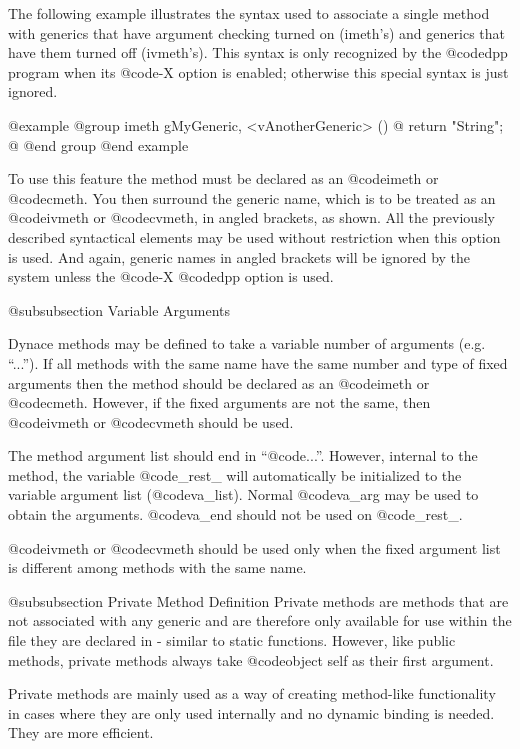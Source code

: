 The following example illustrates the syntax used to associate a single
method with generics that have argument checking turned on (imeth's)
and generics that have them turned off (ivmeth's).  This syntax is
only recognized by the @code{dpp} program when its @code{-X} option is enabled;
otherwise this special syntax is just ignored.


@example
@group
imeth   gMyGeneric, <vAnotherGeneric> ()
@{
        return "String";
@}
@end group
@end example


To use this feature the method must be declared as an @code{imeth} or
@code{cmeth}.  You then surround the generic name, which is to be
treated as an @code{ivmeth} or @code{cvmeth}, in angled brackets, as
shown.  All the previously described syntactical elements may be
used without restriction when this option is used.  And again,
generic names in angled brackets will be ignored by the system unless
the @code{-X} @code{dpp} option is used.




@subsubsection Variable Arguments

Dynace methods may be defined to take a variable number of arguments
(e.g. ``...'').  If all methods with the same name have the same number
and type of fixed arguments then the method should be declared as an
@code{imeth} or @code{cmeth}.  However, if the fixed arguments are not
the same, then @code{ivmeth} or @code{cvmeth} should be used.

The method argument list should end in ``@code{...}''.  However, internal
to the method, the variable @code{_rest_} will automatically be
initialized to the variable argument list (@code{va_list}).  Normal
@code{va_arg} may be used to obtain the arguments.  @code{va_end}
should not be used on @code{_rest_}.

@code{ivmeth} or @code{cvmeth} should be used only when the fixed argument list
is different among methods with the same name.


@subsubsection Private Method Definition
Private methods are methods that are not associated with any generic
and are therefore only available for use within the file they are
declared in - similar to static functions.  However, like public
methods, private methods always take @code{object self} as their
first argument.

Private methods are mainly used as a way of creating method-like
functionality in cases where they are only used internally and no
dynamic binding is needed.  They are more efficient.

